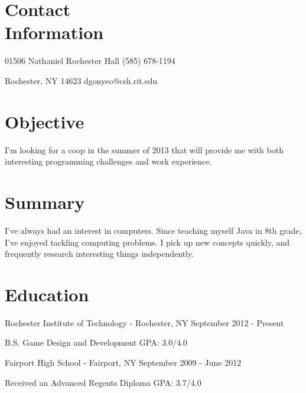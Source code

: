 \documentclass[letterpaper,margin,line,11pt]{resume}
\newcommand{\rdate}[1]{\hfill {\small #1}}
\begin{document}
\begin{resume}
\section{\mysidestyle Contact \\ Information} 
	\begin{asparablank}
		\item 01506 Nathaniel Rochester Hall \hfill (585) 678-1194
		\item Rochester, NY 14623 \hfill dgonyeo@csh.rit.edu
	\end{asparablank}

\section{\mysidestyle Objective}
	I'm looking for a coop in the summer of 2013 that will provide me with both interesting programming challenges and work experience.

\section{\mysidestyle Summary}
        I've always had an interest in computers. Since teaching myself Java in 8th grade, I've enjoyed tackling computing problems. I pick up new concepts quickly, and frequently research interesting things independently.

\section{\mysidestyle Education}
	\begin{compactdesc}
		\item[Rochester Institute of Technology] - Rochester, NY \rdate{September 2012 - Present}
		\begin{compactitem} { \small
			\item B.S. Game Design and Development \hfill GPA: 3.0/4.0 \\
		} \end{compactitem}
                \item[Fairport High School] - Fairport, NY \rdate{September 2009 - June 2012}
                \begin{compactitem} {\small
                        \item Received an Advanced Regents Diploma \hfill GPA: 3.7/4.0
                } \end{compactitem}
	\end{compactdesc}


\end{resume}
\end{document}
